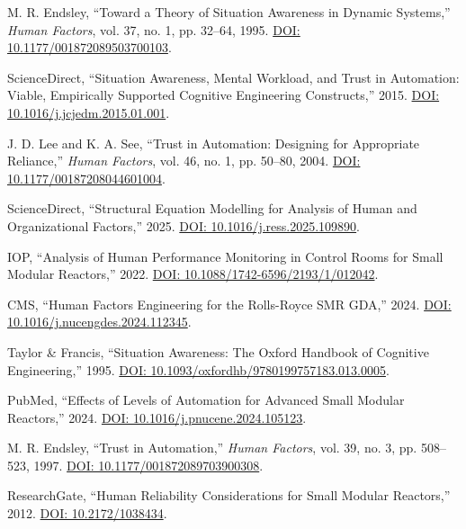 \documentclass[conference]{IEEEtran}
\begin{document}
\begin{table}[t]
\begin{thebibliography}{54}
M. R. Endsley, ``Toward a Theory of Situation Awareness in Dynamic Systems,'' \emph{Human Factors}, vol. 37, no. 1, pp. 32--64, 1995. \href{https://doi.org/10.1177/001872089503700103}{DOI: 10.1177/001872089503700103}.

ScienceDirect, ``Situation Awareness, Mental Workload, and Trust in Automation: Viable, Empirically Supported Cognitive Engineering Constructs,'' 2015. \href{https://doi.org/10.1016/j.jcjedm.2015.01.001}{DOI: 10.1016/j.jcjedm.2015.01.001}.

J. D. Lee and K. A. See, ``Trust in Automation: Designing for Appropriate Reliance,'' \emph{Human Factors}, vol. 46, no. 1, pp. 50--80, 2004. \href{https://doi.org/10.1177/00187208044601004}{DOI: 10.1177/00187208044601004}.

ScienceDirect, ``Structural Equation Modelling for Analysis of Human and Organizational Factors,'' 2025. \href{https://doi.org/10.1016/j.ress.2025.109890}{DOI: 10.1016/j.ress.2025.109890}.

IOP, ``Analysis of Human Performance Monitoring in Control Rooms for Small Modular Reactors,'' 2022. \href{https://doi.org/10.1088/1742-6596/2193/1/012042}{DOI: 10.1088/1742-6596/2193/1/012042}.

CMS, ``Human Factors Engineering for the Rolls-Royce SMR GDA,'' 2024. \href{https://doi.org/10.1016/j.nucengdes.2024.112345}{DOI: 10.1016/j.nucengdes.2024.112345}.

Taylor & Francis, ``Situation Awareness: The Oxford Handbook of Cognitive Engineering,'' 1995. \href{https://doi.org/10.1093/oxfordhb/9780199757183.013.0005}{DOI: 10.1093/oxfordhb/9780199757183.013.0005}.

PubMed, ``Effects of Levels of Automation for Advanced Small Modular Reactors,'' 2024. \href{https://doi.org/10.1016/j.pnucene.2024.105123}{DOI: 10.1016/j.pnucene.2024.105123}.

M. R. Endsley, ``Trust in Automation,'' \emph{Human Factors}, vol. 39, no. 3, pp. 508--523, 1997. \href{https://doi.org/10.1177/001872089703900308}{DOI: 10.1177/001872089703900308}.

ResearchGate, ``Human Reliability Considerations for Small Modular Reactors,'' 2012. \href{https://doi.org/10.2172/1038434}{DOI: 10.2172/1038434}.


\end{thebibliography}
\end{table}
\end{document}
